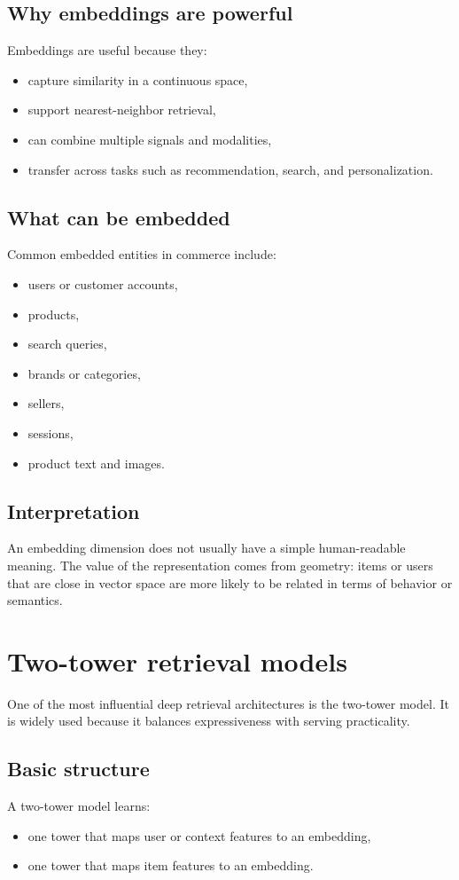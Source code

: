 \subsection{Why embeddings are powerful}
Embeddings are useful because they:
\begin{itemize}
  \item capture similarity in a continuous space,
  \item support nearest-neighbor retrieval,
  \item can combine multiple signals and modalities,
  \item transfer across tasks such as recommendation, search, and personalization.
\end{itemize}

\subsection{What can be embedded}
Common embedded entities in commerce include:
\begin{itemize}
  \item users or customer accounts,
  \item products,
  \item search queries,
  \item brands or categories,
  \item sellers,
  \item sessions,
  \item product text and images.
\end{itemize}

\subsection{Interpretation}
An embedding dimension does not usually have a simple human-readable meaning.
The value of the representation comes from geometry:
items or users that are close in vector space are more likely to be related in terms of behavior or semantics.

\section{Two-tower retrieval models}
One of the most influential deep retrieval architectures is the two-tower model.
It is widely used because it balances expressiveness with serving practicality.

\subsection{Basic structure}
A two-tower model learns:
\begin{itemize}
  \item one tower that maps user or context features to an embedding,
  \item one tower that maps item features to an embedding.
\end{itemize}


